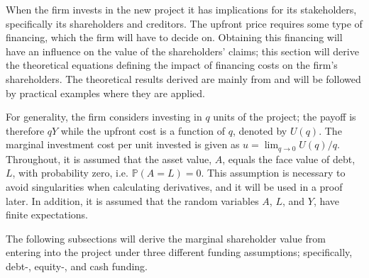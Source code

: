 \documentclass[main.tex]{subfiles}
\begin{document}
    When the firm invests in the new project it has implications for its stakeholders,
    specifically its shareholders and creditors.
    The upfront price requires some type of financing, 
    which the firm will have to decide on.
    Obtaining this financing will have an influence on the value of the shareholders' claims;
    this section will derive the theoretical equations defining
    the impact of financing costs on the firm's shareholders.
    The theoretical results derived are mainly from \textcite{ADS2019} 
    and will be followed by practical examples where they are applied.

    For generality, the firm considers investing in $q$ units of the project; 
    the payoff is therefore $qY$ while the upfront cost is a function of $q$, denoted by $U(q)$. 
    The marginal investment cost per unit invested is given as 
    $u = \lim_{q\rightarrow 0} U(q) / q$.
    Throughout, it is assumed that the asset value, $A$, equals the face value of debt, $L$, 
    with probability zero, i.e. $\mathbb{P}\left(A = L\right) = 0$.
    This assumption is necessary to avoid singularities when calculating derivatives,
    and it will be used in a proof later.
    In addition, it is assumed that the random variables
    $A$, $L$, and $Y$, have finite expectations.

    The following subsections will derive the marginal shareholder value from entering into the project
    under three different funding assumptions; specifically, debt-, equity-, and cash funding.
\end{document}
